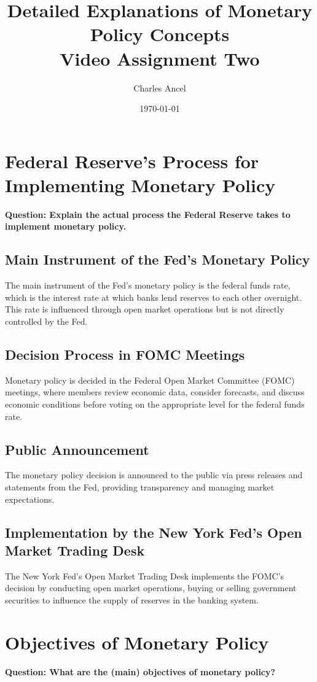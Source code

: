 \documentclass{article}
\title{Detailed Explanations of Monetary Policy Concepts \\ \large Video Assignment Two}
\author{Charles Ancel}
\date{\today}
\begin{document}
\maketitle

\section{Federal Reserve's Process for Implementing Monetary Policy}
\textbf{Question: Explain the actual process the Federal Reserve takes to implement monetary policy.}

\subsection{Main Instrument of the Fed's Monetary Policy}
The main instrument of the Fed's monetary policy is the federal funds rate, which is the interest rate at which banks lend reserves to each other overnight. This rate is influenced through open market operations but is not directly controlled by the Fed.

\subsection{Decision Process in FOMC Meetings}
Monetary policy is decided in the Federal Open Market Committee (FOMC) meetings, where members review economic data, consider forecasts, and discuss economic conditions before voting on the appropriate level for the federal funds rate.

\subsection{Public Announcement}
The monetary policy decision is announced to the public via press releases and statements from the Fed, providing transparency and managing market expectations.

\subsection{Implementation by the New York Fed’s Open Market Trading Desk}
The New York Fed's Open Market Trading Desk implements the FOMC's decision by conducting open market operations, buying or selling government securities to influence the supply of reserves in the banking system.

\section{Objectives of Monetary Policy}
\textbf{Question: What are the (main) objectives of monetary policy?}
\end{document}
